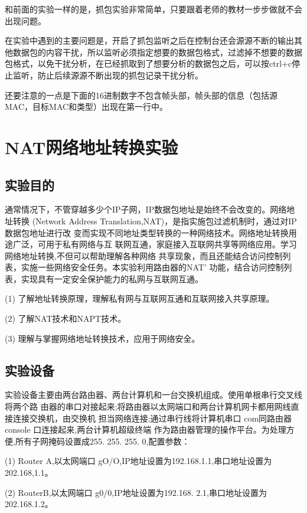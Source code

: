 \documentclass[lang=cn,11pt,a4paper,cite=authoryear]{elegantpaper}
\begin{document}
和前面的实验一样的是，抓包实验非常简单，只要跟着老师的教材一步步做就不会出现问题。

在实验中遇到的主要问题是，开启了抓包监听之后在控制台还会源源不断的输出其他数据包的内容干扰，所以监听必须指定想要的数据包格式，过滤掉不想要的数据包格式，以免干扰分析，在已经抓取到了想要分析的数据包之后，可以按ctrl+c停止监听，防止后续源源不断出现的抓包记录干扰分析。

还要注意的一点是下面的16进制数字不包含帧头部，帧头部的信息（包括源MAC，目标MAC和类型）出现在第一行中。

\section{NAT网络地址转换实验}
\subsection{实验目的}

通常情况下，不管穿越多少个IP子网，IP数据包地址是始终不会改变的。网络地址转换 (Network Address Translation,NAT)，是指实施包过滤机制时，通过对IP数据包地址进行改 变而实现不同地址类型转换的一种网络技术。网络地址转换用途广泛，可用于私有网络与互 联网互通，家庭接入互联网共享等网络应用。学习网络地址转换,不但可以帮助理解各种网络 共享现象，而且还能结合访问控制列表，实施一些网络安全任务。本实验利用路由器的NAT' 功能，结合访问控制列表，实现具有一定安全保护能力的私网与互联网互通。

(1)	了解地址转换原理，理解私有网与互联网互通和互联网接入共享原理。

(2)	了解NAT技术和NAPT技术。

(3)	理解与掌握网络地址转换技术，应用于网络安全。


\subsection{实验设备}

实验设备主要由两台路由器、两台计算机和一台交换机组成。使用单根串行交叉线将两个路 由器的串口对接起来;将路由器以太网端口和两台计算机网卡都用网线直接连接交换机，由交换机 担当网络连接;通过串行线将计算机串口 com同路由器console 口连接起来,两台计算机超级终端 作为路由器管理的操作平台。为处理方便,所有子网掩码设置成255. 255. 255. 0,配置参数：

(1)	Router A,以太网端口 gO/O,IP地址设置为192.168.1.1,串口地址设置为202.168,1.1。

(2)	RouterB,以太网端口 g0/0,IP地址设置为192.168. 2.1,串口地址设置为202.168.1.2。
\end{document}
